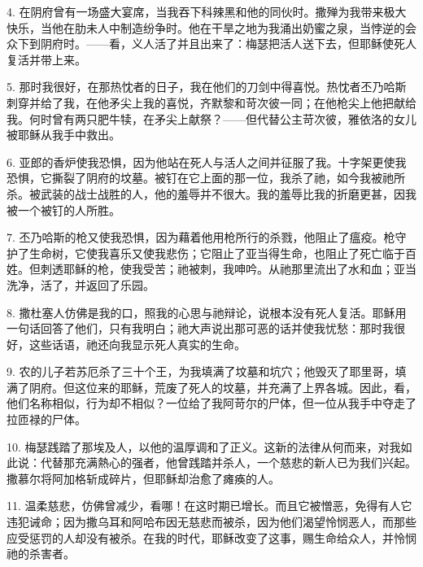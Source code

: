 4. 在阴府曾有一场盛大宴席，当我吞下科辣黑和他的同伙时。撒殚为我带来极大快乐，当他在肋未人中制造纷争时。他在干旱之地为我涌出奶蜜之泉，当悖逆的会众下到阴府时。——看，义人活了并且出来了：梅瑟把活人送下去，但耶稣使死人复活并带上来。\par

5. 那时我很好，在那热忱者的日子，我在他们的刀剑中得喜悦。热忱者丕乃哈斯刺穿并给了我，在他矛尖上我的喜悦，齐默黎和苛次彼一同；在他枪尖上他把献给我。何时曾有两只肥牛犊，在矛尖上献祭？——但代替公主苛次彼，雅依洛的女儿被耶稣从我手中救出。\par

6. 亚郎的香炉使我恐惧，因为他站在死人与活人之间并征服了我。十字架更使我恐惧，它撕裂了阴府的坟墓。被钉在它上面的那一位，我杀了祂，如今我被祂所杀。被武装的战士战胜的人，他的羞辱并不很大。我的羞辱比我的折磨更甚，因我被一个被钉的人所胜。\par

7. 丕乃哈斯的枪又使我恐惧，因为藉着他用枪所行的杀戮，他阻止了瘟疫。枪守护了生命树，它使我喜乐又使我悲伤；它阻止了亚当得生命，也阻止了死亡临于百姓。但刺透耶稣的枪，使我受苦；祂被刺，我呻吟。从祂那里流出了水和血；亚当洗净，活了，并返回了乐园。\par

8. 撒杜塞人仿佛是我的口，照我的心思与祂辩论，说根本没有死人复活。耶稣用一句话回答了他们，只有我明白；祂大声说出那可恶的话并使我忧愁：那时我很好，这些话语，祂还向我显示死人真实的生命。\par

9. 农的儿子若苏厄杀了三十个王，为我填满了坟墓和坑穴；他毁灭了耶里哥，填满了阴府。但这位来的耶稣，荒废了死人的坟墓，并充满了上界各城。因此，看，他们名称相似，行为却不相似？一位给了我阿苛尔的尸体，但一位从我手中夺走了拉匝禄的尸体。\par

10. 梅瑟践踏了那埃及人，以他的温厚调和了正义。这新的法律从何而来，对我如此说：\newline{}代替那充满熱心的强者，他曾践踏并杀人，一个慈悲的新人已为我们兴起。撒慕尔将阿加格斩成碎片，但耶稣却治愈了瘫痪的人。\par

11. 温柔慈悲，仿佛曾减少，看哪！在这时期已增长。而且它被憎恶，免得有人它违犯诫命；因为撒乌耳和阿哈布因无慈悲而被杀，因为他们渴望怜悯恶人，而那些应受惩罚的人却没有被杀。在我的时代，耶稣改变了这事，赐生命给众人，并怜悯祂的杀害者。\par

